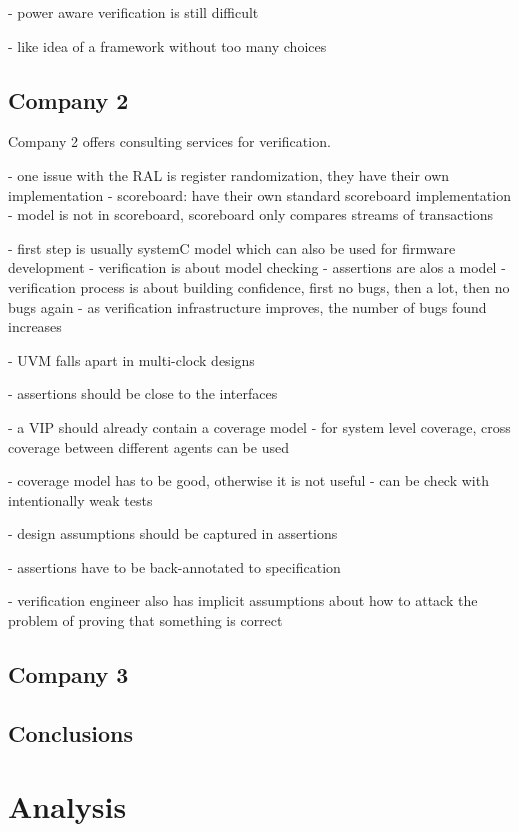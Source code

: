 \documentclass[12pt]{book}
\begin{document}
- power aware verification is still difficult

- like idea of a framework without too many choices

\section{Company 2}

Company 2 offers consulting services for verification. 

- one issue with the RAL is register randomization, they have their own implementation
- scoreboard: have their own standard scoreboard implementation
- model is not in scoreboard, scoreboard only compares streams of transactions

- first step is usually systemC model which can also be used for firmware development
- verification is about model checking
- assertions are alos a model
- verification process is about building confidence, first no bugs, then a lot, then no bugs again
- as verification infrastructure improves, the number of bugs found increases

- UVM falls apart in multi-clock designs

- assertions should be close to the interfaces

- a VIP should already contain a coverage model
- for system level coverage, cross coverage between different agents can be used

- coverage model has to be good, otherwise it is not useful
- can be check with intentionally weak tests

- design assumptions should be captured in assertions

- assertions have to be back-annotated to specification

- verification engineer also has implicit assumptions about how to attack the problem of proving that something is correct

\section{Company 3}

\section{Conclusions}

\chapter{Analysis} %
\end{document}
